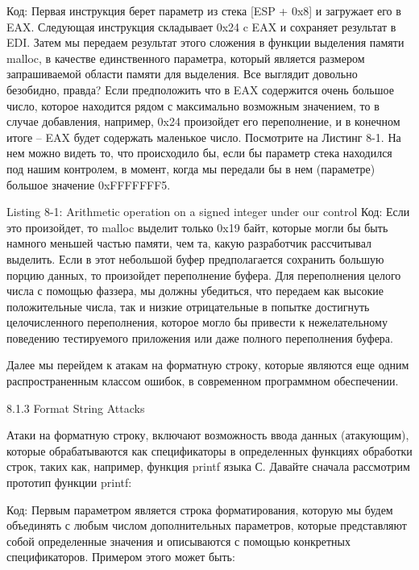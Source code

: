 \documentclass[12pt]{book}
\begin{document}
Код:
Первая инструкция берет параметр из стека [ESP + 0x8] и загружает его в EAX. Следующая инструкция складывает 0x24 c EAX и сохраняет результат в EDI. Затем мы передаем результат этого сложения в функции выделения памяти malloc, в качестве единственного параметра, который является размером запрашиваемой области памяти для выделения. Все выглядит довольно безобидно, правда? Если предположить что в EAX содержится очень большое число, которое находится рядом с максимально возможным значением, то в случае добавления, например, 0x24 произойдет его переполнение, и в конечном итоге – EAX будет содержать маленькое число. Посмотрите на Листинг 8-1. На нем можно видеть то, что происходило бы, если бы параметр стека находился под нашим контролем, в момент, когда мы передали бы в нем (параметре) большое значение 0xFFFFFFF5.

Listing 8-1: Arithmetic operation on a signed integer under our control
Код:
Если это произойдет, то malloc выделит только 0x19 байт, которые могли бы быть намного меньшей частью памяти, чем та, какую разработчик рассчитывал выделить. Если в этот небольшой буфер предполагается сохранить большую порцию данных, то произойдет переполнение буфера. Для переполнения целого числа с помощью фаззера, мы должны убедиться, что передаем как высокие положительные числа, так и низкие отрицательные в попытке достигнуть целочисленного переполнения, которое могло бы привести к нежелательному поведению тестируемого приложения или даже полного переполнения буфера.

Далее мы перейдем к атакам на форматную строку, которые являются еще одним распространенным классом ошибок, в современном программном обеспечении.

8.1.3 Format String Attacks

Атаки на форматную строку, включают возможность ввода данных (атакующим), которые обрабатываются как спецификаторы в определенных функциях обработки строк, таких как, например, функция printf языка С. Давайте сначала рассмотрим прототип функции printf:

Код:
Первым параметром является строка форматирования, которую мы будем объединять с любым числом дополнительных параметров, которые представляют собой определенные значения и описываются с помощью конкретных спецификаторов. Примером этого может быть:
\end{document}
